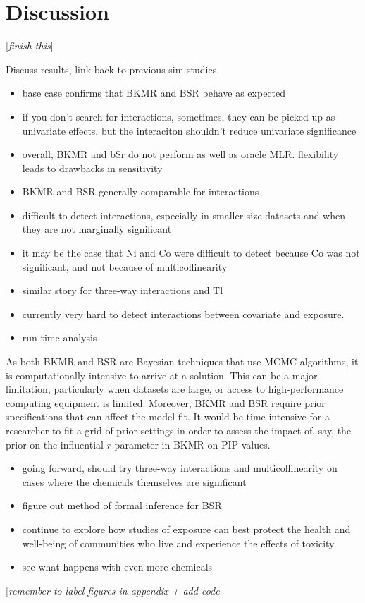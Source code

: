 \documentclass[12pt, twoside]{amherstthesis}
\providecommand{\tightlist}{%
  \setlength{\itemsep}{0pt}\setlength{\parskip}{0pt}}
\begin{document}
\hypertarget{discussion}{%
\section{Discussion}\label{discussion}}

{[}\emph{finish this}{]}

Discuss results, link back to previous sim studies.
\begin{itemize}
\tightlist
\item
  base case confirms that BKMR and BSR behave as expected
\item
  if you don't search for interactions, sometimes, they can be picked up as univariate effects. but the interaciton shouldn't reduce univariate significance
\item
  overall, BKMR and bSr do not perform as well as oracle MLR. flexibility leads to drawbacks in sensitivity
\item
  BKMR and BSR generally comparable for interactions
\item
  difficult to detect interactions, especially in smaller size datasets and when they are not marginally significant
\item
  it may be the case that Ni and Co were difficult to detect because Co was not significant, and not because of multicollinearity
\item
  similar story for three-way interactions and Tl
\item
  currently very hard to detect interactions between covariate and exposure.
\item
  run time analysis
\end{itemize}
As both BKMR and BSR are Bayesian techniques that use MCMC algorithms, it is computationally intensive to arrive at a solution. This can be a major limitation, particularly when datasets are large, or access to high-performance computing equipment is limited. Moreover, BKMR and BSR require prior specifications that can affect the model fit. It would be time-intensive for a researcher to fit a grid of prior settings in order to assess the impact of, say, the prior on the influential \(r\) parameter in BKMR on PIP values.
\begin{itemize}
\tightlist
\item
  going forward, should try three-way interactions and multicollinearity on cases where the chemicals themselves are significant
\item
  figure out method of formal inference for BSR
\item
  continue to explore how studies of exposure can best protect the health and well-being of communities who live and experience the effects of toxicity
\item
  see what happens with even more chemicals
\end{itemize}
{[}\emph{remember to label figures in appendix + add code}{]}
\end{document}
